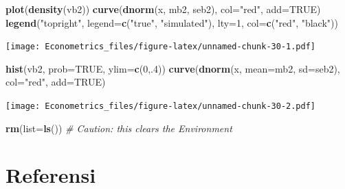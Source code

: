 \documentclass[
]{book}
\newenvironment{Shaded}{\begin{snugshade}}{\end{snugshade}}
\newcommand{\AttributeTok}[1]{\textcolor[rgb]{0.13,0.29,0.53}{#1}}
\newcommand{\CommentTok}[1]{\textcolor[rgb]{0.56,0.35,0.01}{\textit{#1}}}
\newcommand{\ConstantTok}[1]{\textcolor[rgb]{0.56,0.35,0.01}{#1}}
\newcommand{\DecValTok}[1]{\textcolor[rgb]{0.00,0.00,0.81}{#1}}
\newcommand{\FunctionTok}[1]{\textcolor[rgb]{0.13,0.29,0.53}{\textbf{#1}}}
\newcommand{\NormalTok}[1]{#1}
\newcommand{\StringTok}[1]{\textcolor[rgb]{0.31,0.60,0.02}{#1}}
\begin{document}
\begin{Shaded}
\begin{Highlighting}[]
\FunctionTok{plot}\NormalTok{(}\FunctionTok{density}\NormalTok{(vb2))}
\FunctionTok{curve}\NormalTok{(}\FunctionTok{dnorm}\NormalTok{(x, mb2, seb2), }\AttributeTok{col=}\StringTok{"red"}\NormalTok{, }\AttributeTok{add=}\ConstantTok{TRUE}\NormalTok{)}
\FunctionTok{legend}\NormalTok{(}\StringTok{"topright"}\NormalTok{, }\AttributeTok{legend=}\FunctionTok{c}\NormalTok{(}\StringTok{"true"}\NormalTok{, }\StringTok{"simulated"}\NormalTok{), }
       \AttributeTok{lty=}\DecValTok{1}\NormalTok{, }\AttributeTok{col=}\FunctionTok{c}\NormalTok{(}\StringTok{"red"}\NormalTok{, }\StringTok{"black"}\NormalTok{))}
\end{Highlighting}
\end{Shaded}

\texttt{[image: Econometrics\_files/figure-latex/unnamed-chunk-30-1.pdf]}

\begin{Shaded}
\begin{Highlighting}[]
\FunctionTok{hist}\NormalTok{(vb2, }\AttributeTok{prob=}\ConstantTok{TRUE}\NormalTok{, }\AttributeTok{ylim=}\FunctionTok{c}\NormalTok{(}\DecValTok{0}\NormalTok{,.}\DecValTok{4}\NormalTok{))}
\FunctionTok{curve}\NormalTok{(}\FunctionTok{dnorm}\NormalTok{(x, }\AttributeTok{mean=}\NormalTok{mb2, }\AttributeTok{sd=}\NormalTok{seb2), }\AttributeTok{col=}\StringTok{"red"}\NormalTok{, }\AttributeTok{add=}\ConstantTok{TRUE}\NormalTok{)}
\end{Highlighting}
\end{Shaded}

\texttt{[image: Econometrics\_files/figure-latex/unnamed-chunk-30-2.pdf]}

\begin{Shaded}
\begin{Highlighting}[]
\FunctionTok{rm}\NormalTok{(}\AttributeTok{list=}\FunctionTok{ls}\NormalTok{()) }\CommentTok{\# Caution: this clears the Environment}
\end{Highlighting}
\end{Shaded}

\hypertarget{referensi}{%
\chapter{Referensi}\label{referensi}}

  
\end{document}
